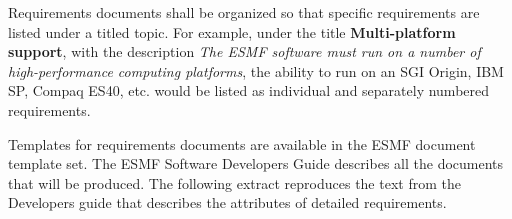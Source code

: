 
Requirements documents shall be organized so that specific requirements are
listed under a titled topic.  For example, under the title {\bf Multi-platform 
support}, with the description {\it The ESMF software must run on a number of high-performance
computing platforms}, the ability to run on an SGI Origin, IBM SP,
Compaq ES40, etc. would be listed as individual and separately numbered 
requirements.   

Templates for requirements documents are available in the ESMF document
template set. The ESMF Software Developers Guide describes all the
documents that will be produced. The following extract reproduces
the text from the Developers guide that describes the attributes
of detailed requirements.









